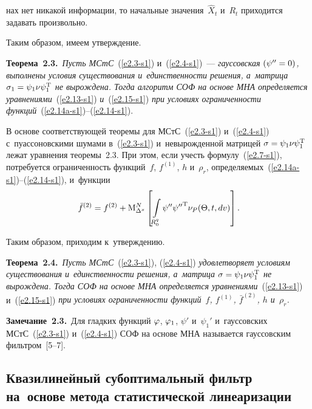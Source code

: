 \begin{multicols}{2}
\pagebreak

\noindent
 нах нет никакой информации, то начальные
значения~$\hat X_t$ и~$R_t$ приходится задавать произвольно.

Таким образом, имеем утверждение.

\smallskip

\noindent
\textbf{Теорема~2.3.}\
\textit{Пусть МСтС}~(\ref{e2.3-s1}) и~(\ref{e2.4-s1})~--- 
\textit{гауссовская  $(\psi''\hm=0)$, выполнены условия существования 
и~единственности решения, а~матрица $\si_1\hm=\psi_1 \nu \psi_1^{\mathrm{T}}$ 
не вырождена. Тогда алгоритм СОФ на основе МНА определяется  
уравнениями}~(\ref{e2.13-s1}) \textit{и}~(\ref{e2.15-s1}) 
\textit{при условиях ограниченности функций}~(\ref{e2.14a-s1})--(\ref{e2.14-s1}).

\smallskip

В основе соответствующей теоремы для МСтС~(\ref{e2.3-s1}) и~(\ref{e2.4-s1}) 
с~пуассоновскими шумами в~(\ref{e2.3-s1}) и~невырожденной матрицей 
$\si\hm=\psi_1 \nu \psi_1^{\mathrm{T}}$ лежат уравнения теоремы~2.3. 
При этом, если учесть формулу~(\ref{e2.7-s1}), потребуется ограниченность 
функций~$f$, $f^{(1)}$, $h$ и~$\rho_r$, определяемых~(\ref{e2.14a-s1})--(\ref{e2.14-s1}), и~функции
    \begin{equation}
    \bar f^{(2)}=f^{(2)}+ \mathrm{M}_{\Delta^x}^N \left[ \int\limits_{R_0^q} 
    \psi''{\psi''}^{\mathrm{T}} \nu_P (\Theta, t, dv)\right].\label{e2.16-s1}
    \end{equation}

Таким образом, приходим к~утверждению.

\smallskip

\noindent
\textbf{Теорема~2.4.}\
\textit{Пусть МСтС}~(\ref{e2.3-s1}), (\ref{e2.4-s1}) 
\textit{удовлетворяет условиям существования и~единственности решения, а~матрица 
$\si\hm=\psi_1 \nu \psi_1^{\mathrm{T}}$ не вырождена. Тогда  СОФ на основе МНА 
определяется  уравнениями}~(\ref{e2.13-s1}) и~(\ref{e2.15-s1}) 
\textit{при условиях ограниченности функций~$f$, $f^{(1)}$, $\bar f^{(2)}$, $h$
и~$\rho_r$.}

\smallskip

\noindent
\textbf{Замечание~2.3.}\
Для гладких функций $\varphi$, $\varphi_1$, $\psi'$ и~$\psi_1'$ и~гауссовских 
МСтС~(\ref{e2.3-s1}) и~(\ref{e2.4-s1}) СОФ на основе МНА называется гауссовским 
фильтром~[5--7].


\subsection{Квазилинейный субоптимальный фильтр на~основе метода 
статистической линеаризации} %


\end{multicols}
